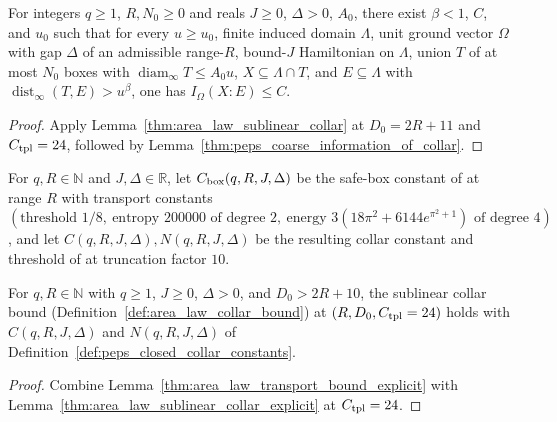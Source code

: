 \begin{lemma}
    \label{thm:peps_coarse_information_finite_domain}
    \leanok
    For integers $q\ge1$, $R,N_0\ge0$ and reals $J\ge0$, $\Delta>0$, $A_0$, there exist $\beta<1$, $C$, and $u_0$ such that for every $u\ge u_0$, finite induced domain $\Lambda$, unit ground vector $\Omega$ with gap $\Delta$ of an admissible range-$R$, bound-$J$ Hamiltonian on $\Lambda$, union $T$ of at most $N_0$ boxes with $\operatorname{diam}_\infty T\le A_0u$, $X\subseteq\Lambda\cap T$, and $E\subseteq\Lambda$ with $\operatorname{dist}_\infty(T,E)>u^\beta$, one has $I_\Omega(X:E)\le C$.
\end{lemma}
\begin{proof}
    \leanok
    Apply Lemma~\ref{thm:area_law_sublinear_collar} at $D_0=2R+11$ and $C_{\rm tpl}=24$, followed by Lemma~\ref{thm:peps_coarse_information_of_collar}.
\end{proof}

\begin{definition}
    \label{def:peps_closed_collar_constants}
    \leanok
    For $q,R\in\mathbb N$ and $J,\Delta\in\mathbb R$, let $C_{\rm box}(q,R,J,\Delta)$ be the safe-box constant of \cite[Proposition~9.5]{OpenAI2026AreaLaw} at range $R$ with transport constants $(\text{threshold }1/8,\ \text{entropy }200000\text{ of degree }2,\ \text{energy }3(18\pi^2+6144e^{\pi^2+1})\text{ of degree }4)$, and let $C(q,R,J,\Delta),N(q,R,J,\Delta)$ be the resulting collar constant and threshold of \cite[Proposition~9.6]{OpenAI2026AreaLaw} at truncation factor $10$.
\end{definition}

\begin{lemma}
    \label{thm:peps_collar_closed}
    \leanok
    For $q,R\in\mathbb N$ with $q\ge1$, $J\ge0$, $\Delta>0$, and $D_0>2R+10$, the sublinear collar bound (Definition~\ref{def:area_law_collar_bound}) at $(R,D_0,C_{\rm tpl}=24)$ holds with $C(q,R,J,\Delta)$ and $N(q,R,J,\Delta)$ of Definition~\ref{def:peps_closed_collar_constants}.
\end{lemma}
\begin{proof}
    \leanok
    Combine Lemma~\ref{thm:area_law_transport_bound_explicit} with Lemma~\ref{thm:area_law_sublinear_collar_explicit} at $C_{\rm tpl}=24$.
\end{proof}

